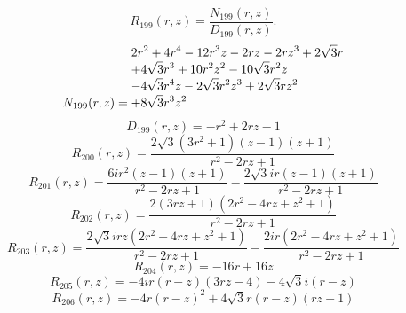 \documentclass[11pt,a4paper]{article}
\begin{document}
\begin{equation}
R_{199}(r,z)=\frac{N_{199}(r,z)}{D_{199}(r,z)}.
\label{eq:cat-rational-199}
\end{equation}
\begin{equation}
N_{199}(r,z)=\shortstack[l]{$\displaystyle 2 r^{2} + 4 r^{4} - 12 r^{3} z - 2 r z - 2 r z^{3} + 2 \sqrt{3} r$\\
$\displaystyle  + 4 \sqrt{3} r^{3} + 10 r^{2} z^{2} - 10 \sqrt{3} r^{2} z$\\
$\displaystyle  - 4 \sqrt{3} r^{4} z - 2 \sqrt{3} r^{2} z^{3} + 2 \sqrt{3} r z^{2}$\\
$\displaystyle  + 8 \sqrt{3} r^{3} z^{2}$}
\label{eq:cat-numerator-199}
\end{equation}
\begin{equation}
D_{199}(r,z)=- r^{2} + 2 r z - 1
\label{eq:cat-denominator-199}
\end{equation}
\begin{equation}
R_{200}(r,z)=\frac{2 \sqrt{3} \left(3 r^{2} + 1\right) \left(z - 1\right) \left(z + 1\right)}{r^{2} - 2 r z + 1}
\label{eq:cat-rational-200}
\end{equation}
\begin{equation}
R_{201}(r,z)=\frac{6 i r^{2} \left(z - 1\right) \left(z + 1\right)}{r^{2} - 2 r z + 1} - \frac{2 \sqrt{3} i r \left(z - 1\right) \left(z + 1\right)}{r^{2} - 2 r z + 1}
\label{eq:cat-rational-201}
\end{equation}
\begin{equation}
R_{202}(r,z)=\frac{2 \left(3 r z + 1\right) \left(2 r^{2} - 4 r z + z^{2} + 1\right)}{r^{2} - 2 r z + 1}
\label{eq:cat-rational-202}
\end{equation}
\begin{equation}
R_{203}(r,z)=\frac{2 \sqrt{3} i r z \left(2 r^{2} - 4 r z + z^{2} + 1\right)}{r^{2} - 2 r z + 1} - \frac{2 i r \left(2 r^{2} - 4 r z + z^{2} + 1\right)}{r^{2} - 2 r z + 1}
\label{eq:cat-rational-203}
\end{equation}
\begin{equation}
R_{204}(r,z)=- 16 r + 16 z
\label{eq:cat-rational-204}
\end{equation}
\begin{equation}
R_{205}(r,z)=- 4 i r \left(r - z\right) \left(3 r z - 4\right) - 4 \sqrt{3} i \left(r - z\right)
\label{eq:cat-rational-205}
\end{equation}
\begin{equation}
R_{206}(r,z)=- 4 r \left(r - z\right)^{2} + 4 \sqrt{3} r \left(r - z\right) \left(r z - 1\right)
\label{eq:cat-rational-206}
\end{equation}
\end{document}
